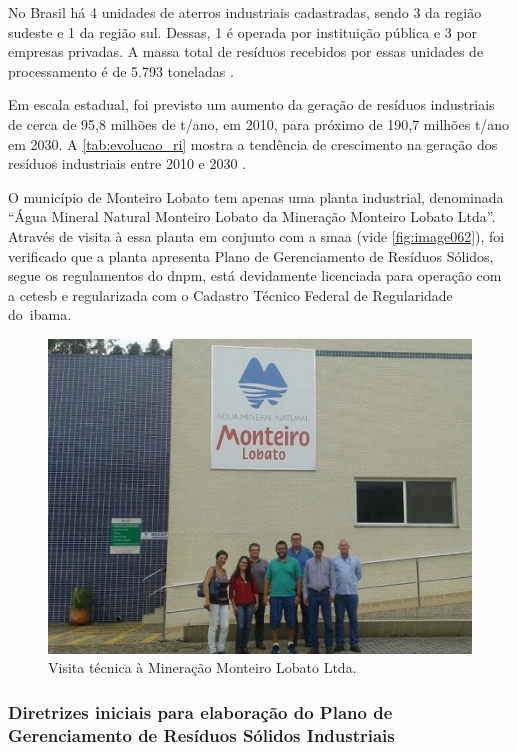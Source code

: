 	No Brasil há 4 unidades de aterros industriais cadastradas, sendo 3 da região sudeste e 1 da região sul. Dessas, 1 é operada por instituição pública e 3 por empresas privadas. A massa total de resíduos recebidos por essas unidades de processamento é de 5.793 toneladas \cite{SNIS2016}.
	
	Em escala estadual, foi previsto um aumento da geração de resíduos industriais de cerca de 95,8 milhões de t/ano, em 2010, para próximo de 190,7 milhões t/ano em 2030. A \autoref{tab:evolucao_ri} mostra a tendência de crescimento na geração dos resíduos industriais entre 2010 e 2030 \cite{PERS2014}.
	
	
	
	O município de Monteiro Lobato tem apenas uma planta industrial, denominada “Água Mineral Natural Monteiro Lobato da Mineração Monteiro Lobato Ltda”. Através de visita à essa planta em conjunto com a \gls{smaa} (vide \autoref{fig:image062}), foi verificado que a planta apresenta Plano de Gerenciamento de Resíduos Sólidos, segue os regulamentos do \gls{dnpm}, está devidamente licenciada para operação com a \gls{cetesb} e regularizada com o Cadastro Técnico Federal de Regularidade do \gls{ibama}.
	
	\begin{figure}
		\centering
		\includegraphics[width=0.75\linewidth]{produtos/prodtres/image062}
		\caption{Visita técnica à Mineração Monteiro Lobato Ltda.}
		\label{fig:image062}
	\end{figure}
	
	
	\subsubsection{Diretrizes iniciais para elaboração do Plano de Gerenciamento de Resíduos Sólidos Industriais}
	
